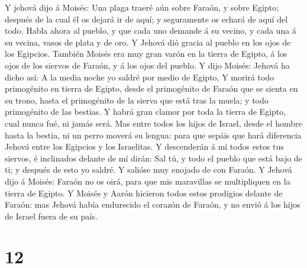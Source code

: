  Y jehová dijo á Moisés: Una plaga traeré aún sobre Faraón,
y sobre Egipto; después de la cual él os dejará ir de aquí; y
seguramente os echará de aquí del todo.  Habla ahora al
pueblo, y que cada uno demande á su vecino, y cada una á su vecina,
vasos de plata y de oro.  Y Jehová dió gracia al pueblo en
los ojos de los Egipcios. También Moisés era muy gran varón en la tierra
de Egipto, á los ojos de los siervos de Faraón, y á los ojos del pueblo.
 Y dijo Moisés: Jehová ha dicho así: A la media noche yo
saldré por medio de Egipto,  Y morirá todo primogénito en
tierra de Egipto, desde el primogénito de Faraón que se sienta en su
trono, hasta el primogénito de la sierva que está tras la muela; y todo
primogénito de las bestias.  Y habrá gran clamor por toda la
tierra de Egipto, cual nunca fué, ni jamás será.  Mas entre
todos los hijos de Israel, desde el hombre hasta la bestia, ni un perro
moverá su lengua: para que sepáis que hará diferencia Jehová entre los
Egipcios y los Israelitas.  Y descenderán á mí todos estos
tus siervos, é inclinados delante de mí dirán: Sal tú, y todo el pueblo
que está bajo de ti; y después de esto yo saldré. Y salióse muy enojado
de con Faraón.  Y Jehová dijo á Moisés: Faraón no os oirá,
para que mis maravillas se multipliquen en la tierra de Egipto.
 Y Moisés y Aarón hicieron todos estos prodigios delante de
Faraón: mas Jehová había endurecido el corazón de Faraón, y no envió á
los hijos de Israel fuera de su país.

\hypertarget{section-11}{%
\section{12}\label{section-11}}

